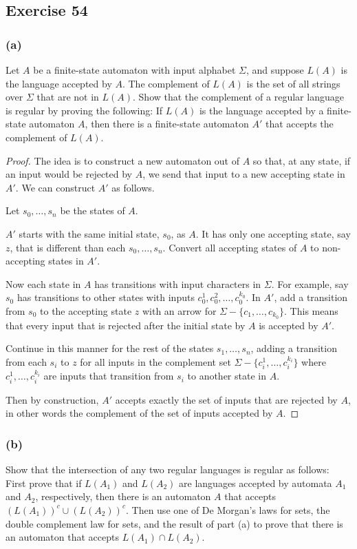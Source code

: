 \documentclass[14pt]{extarticle}
\begin{document}
\subsection{Exercise 54}
\subsubsection{(a)}
Let \(A\) be a finite-state automaton with input alphabet \(\Sigma\), and suppose \(L(A)\) is the language accepted by 
\(A\). The complement of \(L(A)\) is the set of all strings over \(\Sigma\) that are not in \(L(A)\). Show that the 
complement of a regular language is regular by proving the following: If \(L(A)\) is the language accepted by a 
finite-state automaton \(A\), then there is a finite-state automaton \(A'\) that accepts the complement of \(L(A)\).

\begin{proof}
The idea is to construct a new automaton out of \(A\) so that, at any state, if an input would be rejected by \(A\), we send
that input to a new accepting state in \(A'\). We can construct \(A'\) as follows. 

Let \(s_0, \ldots, s_n\) be the states of \(A\).

\(A'\) starts with the same initial state, \(s_0\), as \(A\). It has only one accepting state, say \(z\), that is different 
than each \(s_0, \ldots, s_n\). Convert all accepting states of \(A\) to non-accepting states in \(A'\).

Now each state in \(A\) has transitions with input characters in \(\Sigma\). For example, say \(s_0\) has transitions to 
other states with inputs \(c_0^1, c_0^2, \ldots, c_0^{k_0}\). In \(A'\), add a transition from \(s_0\) to the accepting 
state \(z\) with an arrow for \(\Sigma - \{c_1, \ldots, c_{k_0}\}\). This means that every input that is rejected 
after the initial state by \(A\) is accepted by \(A'\).

Continue in this manner for the rest of the states \(s_1, \ldots, s_n\), adding a transition from each \(s_i\) to \(z\)
for all inputs in the complement set \(\Sigma - \{c_i^1, \ldots, c_i^{k_i}\}\) where \(c_i^1, \ldots, c_i^{k_i}\) are 
inputs that transition from \(s_i\) to another state in \(A\).

Then by construction, \(A'\) accepts exactly the set of inputs that are rejected by \(A\), in other words the complement of
the set of inputs accepted by \(A\).
\end{proof}

\subsubsection{(b)}
Show that the intersection of any two regular languages is regular as follows: First prove that if \(L(A_1)\) and 
\(L(A_2)\) are languages accepted by automata \(A_1\) and \(A_2\), respectively, then there is an automaton \(A\) that 
accepts \((L(A_1))^c \cup (L(A_2))^c\). Then use one of De Morgan’s laws for sets, the double complement law for sets, 
and the result of part (a) to prove that there is an automaton that accepts \(L(A_1) \cap L(A_2)\).
\end{document}
